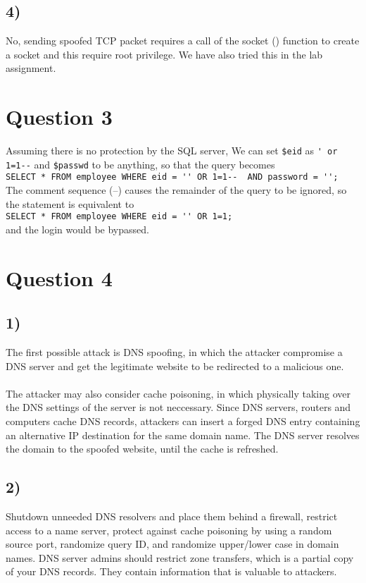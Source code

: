 \documentclass[a4paper]{article}
\begin{document}
\subsection*{4)}
No, sending spoofed TCP packet requires a call of the socket () function to create a socket and this require root privilege. We have also tried this in the lab assignment.
\section*{Question 3}
Assuming there is no protection by the SQL server, We can set \verb+$eid+ as \verb+' or 1=1--+ and \verb+$passwd+ to be anything, so that the query becomes\\
\verb+SELECT * FROM employee WHERE eid = '' OR 1=1--  AND password = '';+\\
The comment sequence (--) causes the remainder of the query to be ignored, so the statement is equivalent to\\
\verb+SELECT * FROM employee WHERE eid = '' OR 1=1;+\\
and the login would be bypassed.
\section*{Question 4}
\subsection*{1)}
The first possible attack is DNS spoofing, in which the attacker compromise a DNS server and get the legitimate website to be redirected to a malicious one.\\\\
The attacker may also consider cache poisoning, in which physically taking over the DNS settings of the server is not neccessary. Since DNS servers, routers and computers cache DNS records, attackers can insert a forged DNS entry containing an alternative IP destination for the same domain name. The DNS server resolves the domain to the spoofed website, until the cache is refreshed.
\subsection*{2)}
Shutdown unneeded DNS resolvers and place them behind a firewall, restrict access to a name server, protect against cache poisoning by using a random source port, randomize query ID, and randomize upper/lower case in domain names. DNS server admins should restrict zone transfers, which is a partial copy of your DNS records. They contain information that is valuable to attackers.
\end{document}
